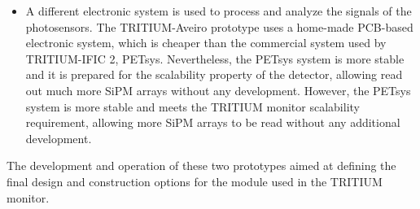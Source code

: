 \begin{itemize}
\item{} A different electronic system is used to process and analyze the signals of the photosensors. The TRITIUM-Aveiro prototype uses a home-made PCB-based electronic system, which is cheaper than the commercial system used by TRITIUM-IFIC 2, PETsys. Nevertheless, the PETsys system is more stable and it is prepared for the scalability property of the detector, allowing read out much more SiPM arrays without any development. However, the PETsys system is more stable and meets the TRITIUM monitor scalability requirement, allowing more SiPM arrays to be read without any additional development.

\end{itemize}

The development and operation of these two prototypes aimed at defining the final design and construction options for the module used in the TRITIUM monitor.
